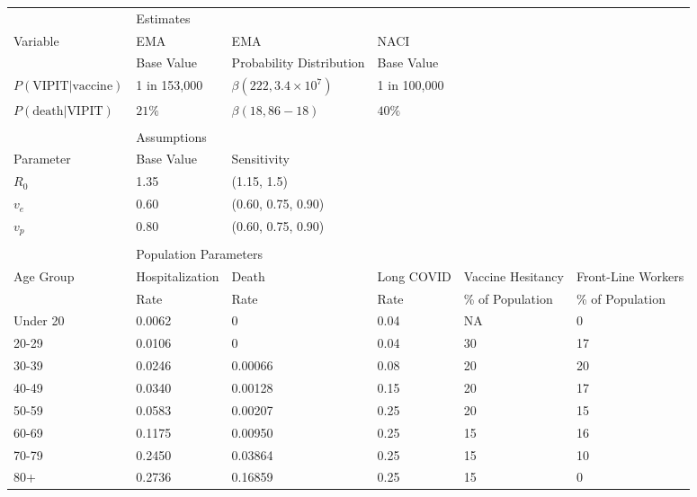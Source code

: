 \documentclass[]{interact}
\theoremstyle{plain}%
\theoremstyle{definition}
\theoremstyle{remark}
\begin{document}
\begin{table}
{\begin{tabular}{llllll} \toprule
 & \multicolumn{2}{l}{Estimates} \\ \cmidrule{2-6}
 Variable & EMA & EMA  & NACI  \\
  & Base Value & Probability Distribution & Base Value \\ \midrule
 $P(\text{VIPIT}|\text{vaccine})$ & 1 in 153,000 & $\beta(222, 3.4\times 10^7)$ & 1 in 100,000 \\
 $P(\text{death}|\text{VIPIT})$ & $21\%$ &  $\beta(18, 86-18)$ & $40\%$ \\ \\
 & \multicolumn{2}{l}{Assumptions} \\ \cmidrule{2-6}
 Parameter  & Base Value & Sensitivity & \\ \midrule
 $R_0$ & 1.35 & (1.15, 1.5) &  \\ 
 $v_e$ & 0.60 & (0.60, 0.75, 0.90) &  \\ 
 $v_p$ & 0.80 & (0.60, 0.75, 0.90) &  \\ \\
 
  & \multicolumn{2}{l}{Population Parameters} \\ \cmidrule{2-6}
  Age  Group & Hospitalization & Death   & Long COVID & Vaccine Hesitancy & Front-Line Workers \\ 
             & Rate            & Rate    & Rate       & \% of Population & \% of Population \\ 

  \midrule
Under 20   & 0.0062    & 0       & 0.04       & NA                & 0           \\ 
20-29      & 0.0106    & 0       & 0.04       & 30               & 17          \\ 
30-39      & 0.0246    & 0.00066 & 0.08       & 20               & 20          \\ 
40-49      & 0.0340    & 0.00128 & 0.15       & 20               & 17          \\ 
50-59      & 0.0583    & 0.00207 & 0.25       & 20               & 15          \\ 
60-69      & 0.1175    & 0.00950 & 0.25       & 15              & 16          \\ 
70-79      & 0.2450    & 0.03864 & 0.25       & 15              & 10          \\ 
80+        & 0.2736    & 0.16859 & 0.25       & 15              & 0           \\
 

\end{tabular}}
\end{table}
\end{document}
